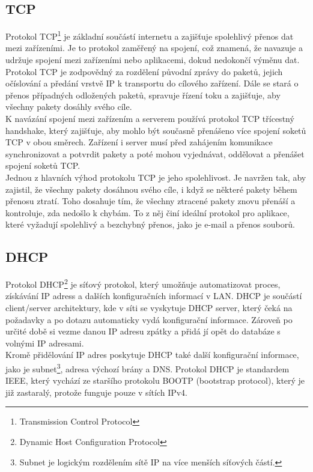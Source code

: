 \documentclass[12pt]{report}			%
\begin{document}
				\subsection{TCP}
Protokol TCP\footnote{Transmission Control Protocol} je základní součástí internetu a zajišťuje spolehlivý přenos dat mezi zařízeními. Je to protokol zaměřený na spojení, což znamená, že navazuje a udržuje spojení mezi zařízeními nebo aplikacemi, dokud nedokončí výměnu dat.
\\
Protokol TCP je zodpovědný za rozdělení původní zprávy do paketů, jejich očíslování a předání vrstvě IP k transportu do cílového zařízení. Dále se stará o přenos případných odložených paketů, spravuje řízení toku a zajišťuje, aby všechny pakety dosáhly svého cíle.
\\
K navázání spojení mezi zařízením a serverem používá protokol TCP třícestný handshake, který zajišťuje, aby mohlo být současně přenášeno více spojení soketů TCP v obou směrech. Zařízení i server musí před zahájením komunikace synchronizovat a potvrdit pakety a poté mohou vyjednávat, oddělovat a přenášet spojení soketů TCP.
\\
Jednou z hlavních výhod protokolu TCP je jeho spolehlivost. Je navržen tak, aby zajistil, že všechny pakety dosáhnou svého cíle, i když se některé pakety během přenosu ztratí. Toho dosahuje tím, že všechny ztracené pakety znovu přenáší a kontroluje, zda nedošlo k chybám. To z něj činí ideální protokol pro aplikace, které vyžadují spolehlivý a bezchybný přenos, jako je e-mail a přenos souborů.\cite{Pruvodce}\cite{TCP}\cite{TCP1}\cite{TCP2}



				\subsection{DHCP}
Protokol DHCP\footnote{Dynamic Host Configuration Protocol} je síťový protokol, který umožňuje automatizovat proces, získávání IP adress a dalších konfiguračních informací v LAN. DHCP je součástí client/server architektury, kde v síti se vyskytuje DHCP server, který čeká na požadavky a po dotazu automaticky vydá konfigurační informace. Zároveň po určité době si vezme danou IP adresu zpátky a přidá jí opět do databáze s volnými IP adresami. 
\\
Kromě přidělování IP adres poskytuje DHCP také další  konfigurační informace, jako je subnet\footnote{Subnet je logickým rozdělením sítě IP na více menších síťových částí.}, adresa výchozí brány a DNS. Protokol DHCP je standardem IEEE, který vychází ze staršího protokolu BOOTP (bootstrap protocol), který je již zastaralý, protože funguje pouze v sítích IPv4.\cite{DHCP1}\cite{DHCP2}\cite{DHCP3}\cite{DHCP4}
\end{document}
